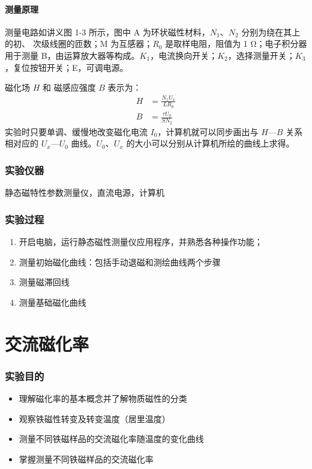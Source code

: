 \documentclass[a4paper,utf8]{article}
\begin{document}
    \subsection{测量原理}
        测量电路如讲义图 1-3 所示，图中 A 为环状磁性材料，$N_1$、$N_2$ 分别为绕在其上的初、 次级线圈的匝数；M 为互感器；$R_0$ 是取样电阻，阻值为 1 \unit{\ohm}；电子积分器用于测量 B，由运算放大器等构成。$K_1$，电流换向开关；$K_2$，选择测量开关；$K_3$，复位按钮开关；E，可调电源。\par
        磁化场 $H$ 和 磁感应强度 $B$ 表示为：
        \begin{align}
            H&=\frac{N_1 U_x}{L R_0}\label{eq:1}\\
            B&=\frac{\tau U_0}{S N_2}\label{eq:2}
        \end{align}
        实验时只要单调、缓慢地改变磁化电流 $I_0$，计算机就可以同步画出与 $H—B$ 关系相对应的 $U_x—U_0$ 曲线。$U_0$、$U_x$ 的大小可以分别从计算机所绘的曲线上求得。
\section{实验仪器}%
    静态磁特性参数测量仪，直流电源，计算机
\section{实验过程}%
    \begin{enumerate}
        \item 开启电脑，运行静态磁性测量仪应用程序，并熟悉各种操作功能；
        \item 测量初始磁化曲线：包括手动退磁和测绘曲线两个步骤
        \item 测量磁滞回线
        \item 测量基础磁化曲线
    \end{enumerate}
\part{交流磁化率}
\setcounter{section}{0}
\section{实验目的}
    \begin{itemize}
        \item 理解磁化率的基本概念并了解物质磁性的分类 
        \item 观察铁磁性转变及转变温度（居里温度）
        \item 测量不同铁磁样品的交流磁化率随温度的变化曲线
        \item 掌握测量不同铁磁样品的交流磁化率
    \end{itemize}
\end{document}
